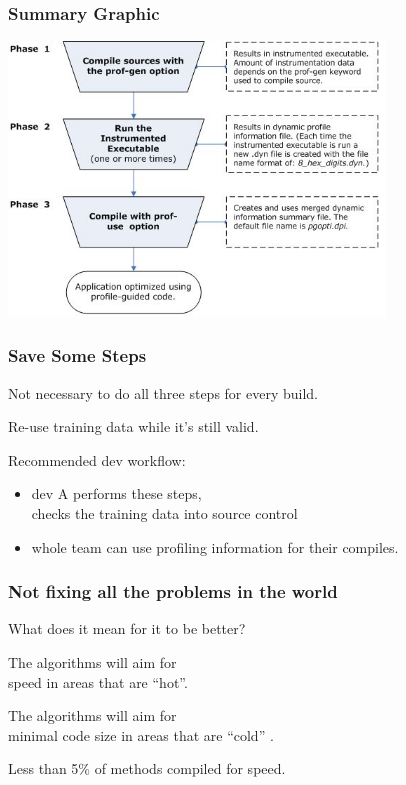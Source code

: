 \begin{frame}
\frametitle{Summary Graphic}

\begin{center}
	\includegraphics[width=0.75\textwidth]{images/pogo-workflow.jpg}
\end{center}

\end{frame}



\begin{frame}
\frametitle{Save Some Steps}


\begin{changemargin}{2cm}
Not necessary to do all three steps for every build. 

Re-use training data while it's still valid.

Recommended dev workflow:
\begin{itemize}
\item dev A performs these steps, \\
checks the training data into source control
\item whole team can use profiling information for their compiles.
\end{itemize}
\end{changemargin}

\end{frame}



\begin{frame}
\frametitle{Not fixing all the problems in the world}


\begin{changemargin}{2cm}
What does it mean for it to be better? 

The algorithms will aim for \\
speed in areas that are ``hot''. 

The algorithms will aim for \\
minimal code size in areas that are ``cold'' .

Less than 5\% of methods compiled for speed.
\end{changemargin}
\end{frame}



